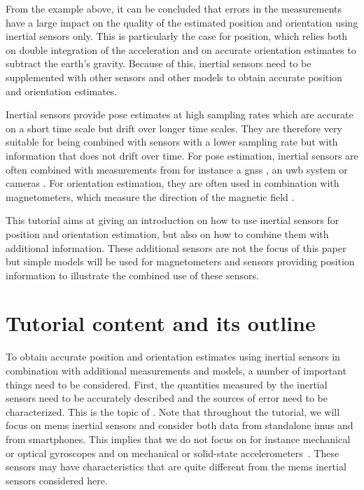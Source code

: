 From the example above, it can be concluded that errors in the measurements have a large impact on the quality of the estimated position and orientation using inertial sensors only. This is particularly the case for position, which relies both on double integration of the acceleration and on accurate orientation estimates to subtract the earth's gravity. Because of this, inertial sensors need to be supplemented with other sensors and other models to obtain accurate position and orientation estimates. 

Inertial sensors provide pose estimates at high sampling rates which are accurate on a short time scale but drift over longer time scales. They are therefore very suitable for being combined with sensors with a lower sampling rate but with information that does not drift over time. For pose estimation, inertial sensors are often combined with measurements from for instance a \acrfull{gnss} \citep{kaplanH:1996,tittertonW:1997,hol:2011}, an \gls{uwb} system \citep{kokHS:2015,sczysloSGK:2008,pittetRMK:2008,corralesCT:2008,deAngelisNSHC:2010} or cameras \citep{corkeLD:2007,holSLSG:2007,liM:2013,martinelli:2012}. For orientation estimation, they are often used in combination with magnetometers, which measure the direction of the magnetic field \citep{sabatini:2006,roetenbergLBV:2005}. 

This tutorial aims at giving an introduction on how to use inertial sensors for position and orientation estimation, but also on how to combine them with additional information. These additional sensors are not the focus of this paper but simple models will be used for magnetometers and sensors providing position information to illustrate the combined use of these sensors.

\section{Tutorial content and its outline}
\label{sec:intro-outline}
To obtain accurate position and orientation estimates using inertial sensors in combination with additional measurements and models, a number of important things need to be considered. First, the quantities measured by the inertial sensors need to be accurately described and the sources of error need to be characterized. This is the topic of . Note that throughout the tutorial, we will focus on \gls{mems} inertial sensors and consider both data from standalone \glspl{imu} and from smartphones. This implies that we do not focus on for instance mechanical or optical gyroscopes and on mechanical or solid-state accelerometers~\citep{tittertonW:1997}. These sensors may have characteristics that are quite different from the \gls{mems} inertial sensors considered here. 

